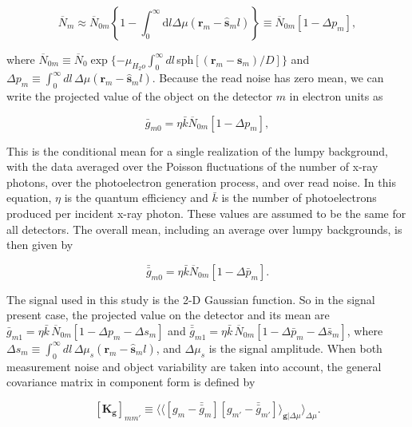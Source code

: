\begin{equation}
\label{xrayeqnapprox}
\overline{N}_m \approx \overline{N}_{0m} \left\{1-\int_{0}^{\infty} \mathrm{d}l \Delta\mu(\mathbf{r}_m - \mathbf{\hat{s}}_ml)\right\} \equiv \overline{N}_{0m}[1-\Delta p_m],
\end{equation}

\noindent
where $\overline{N}_{0m} \equiv \overline{N}_0 \exp\{-\mu_{H_2o} \int_0^{\infty} dl\,$sph$[(\mathbf{r}_m-\mathbf{s}_m )/D] \} $ and $\Delta p_m \equiv \int_0^{\infty} dl \, \Delta \mu(\mathbf{r}_m-\mathbf{\hat{s}}_m l)$.  Because the read noise has zero mean, we can write the projected value of the object on the detector $m$ in electron units as

\begin{equation}
\label{gbar}
\bar{g}_{m0} = \eta \bar{k}\overline{N}_{0m}[1-\Delta p_m],
\end{equation}

\noindent 
This is the conditional mean for a single realization of the lumpy background, with the data averaged over the Poisson fluctuations of the number of x-ray photons, over the photoelectron generation process, and over read noise.  In this equation, $\eta$ is the quantum efficiency and $\bar{k}$ is the number of photoelectrons produced per incident x-ray photon.  These values are assumed to be the same for all detectors.  The overall mean, including an average over lumpy backgrounds, is then given by

\begin{equation}
\label{gdoublebar}
\bar{\bar{g}}_{m0} = \eta\bar{k}\overline{N}_{0m}[1-\Delta \bar{p}_m].
\end{equation}

\noindent
The signal used in this study is the 2-D Gaussian function.  So in the signal present case, the projected value on the detector and its mean are $\bar{g}_{m1} = \eta \bar{k}\, \overline{N}_{0m}[1 - \Delta p_m - \Delta s_m]$ and $ \bar{\bar{g}}_{m1} = \eta\bar{k}\, \overline{N}_{0m}[1 - \Delta \bar{p}_m - \Delta\bar{s}_m]$,  where $\Delta s_m \equiv \int_0^{\infty}dl \, \Delta \mu_s (\mathbf{r}_m - \mathbf{\hat{s}}_m l)$, and $\Delta\mu_s$ is the signal amplitude.
When both measurement noise and object variability are taken into account, the general covariance matrix in component form is defined by~\citep{Barrett2004}

\begin{equation}
\label{gen covariance}
[\mathbf{K_g}]_{mm'} \equiv \langle \langle[g_m-\bar{\bar{g}}_m][g_{m'}-\bar{\bar{g}}_{m'}]\rangle_{\mathbf{g}|\Delta\mu} \rangle_{\Delta\mu}.
\end{equation}

